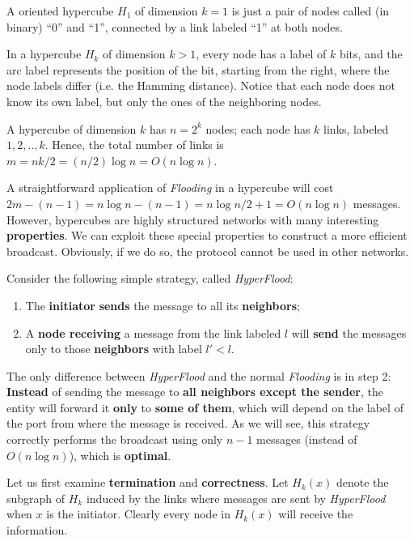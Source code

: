 A oriented hypercube $H_1$ of dimension $k = 1$ is just a pair of nodes called (in binary) “0” and “1”, connected by a link labeled “1” at both nodes. 

In a hypercube $H_k$ of dimension $k>1$, every node has a label of $k$ bits, and the arc label represents the position of the bit, starting from the right, where the node labels differ (i.e. the Hamming distance). Notice that each node does not know its own label, but only the ones of the neighboring nodes.


A hypercube of dimension $k$ has $n = 2^k$ nodes; each node has $k$ links, labeled $1, 2, ..,k$. Hence, the total number of links is $m = nk/2 = (n/2) \log n = O(n \log n)$. 

A straightforward application of \textit{Flooding} in a hypercube will cost $2m- (n - 1) = n \log n - (n - 1) = n \log n/2 + 1 = O(n \log n)$ messages. However, hypercubes are highly structured networks with many interesting \textbf{properties}. We can exploit these special properties to construct a more efficient broadcast. Obviously, if we do so, the protocol cannot be used in other networks.

Consider the following simple strategy, called \textit{HyperFlood}:

\begin{enumerate}
    \item The \textbf{initiator} \textbf{sends} the message to all its \textbf{neighbors};
    \item A \textbf{node receiving} a message from the link labeled $l$ will \textbf{send} the messages only to those \textbf{neighbors} with label $l'<l$.
\end{enumerate}

The only difference between \textit{HyperFlood} and the normal \textit{Flooding} is in step 2: \textbf{Instead} of sending the message to \textbf{all neighbors except the sender}, the entity will forward it \textbf{only} to \textbf{some of them}, which will depend on the label of the port from where the message is received. As we will see, this strategy correctly performs the broadcast using only $n - 1$ messages (instead of $O(n \log n)$), which is \textbf{optimal}. 

Let us first examine \textbf{termination} and \textbf{correctness}. Let $H_k(x)$ denote the subgraph of $H_k$ induced by the links where messages are sent by \textit{HyperFlood} when $x$ is the initiator. Clearly every node in $H_k(x)$ will receive the information.

